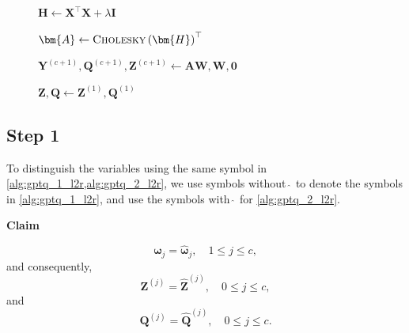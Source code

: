 \documentclass{article} %
\begin{document}
\begin{figure}[!p]
\begin{minipage}[t]{\linewidth}
\begin{algorithm}[H]
$\bm{H} \leftarrow \bm{X}^\top \bm{X} + \lambda \mathbf{I}$

$\bm{A} \leftarrow \textsc{Cholesky} \left( \bm{H} \right)^\top$

$\bm{Y}^{(c+1)}, \bm{Q}^{(c+1)}, \bm{Z}^{(c+1)} \leftarrow \bm{A} \bm{W}, \bm{W}, \bm{0}$


$\bm{Z}, \bm{Q} \leftarrow \bm{Z}^{(1)}, \bm{Q}^{(1)}$

\end{algorithm}
\end{minipage}
\end{figure}

\subsection{Step 1}
\label{sec:app_proof_gptq_babai_step_1}

To distinguish the variables using the same symbol in \cref{alg:gptq_1_l2r,alg:gptq_2_l2r}, we use symbols without $\hat{\ }$ to denote the symbols in \cref{alg:gptq_1_l2r}, and use the symbols with $\hat{\ }$ for \cref{alg:gptq_2_l2r}.

\textbf{Claim}

\begin{equation}
\bm{\omega}_{j} = \hat{\bm{\omega}}_{j}, \quad 1 \le j \le c ,
\label{eq:p1_claim_o}
\end{equation}
and consequently,
\begin{equation}
\bm{Z}^{(j)} = \hat{\bm{Z}}^{(j)}, \quad 0 \le j \le c ,
\label{eq:p1_claim_z}
\end{equation}
and
\begin{equation}
\bm{Q}^{(j)} = \hat{\bm{Q}}^{(j)}, \quad 0 \le j \le c .
\label{eq:p1_claim_q}
\end{equation}
\end{document}
